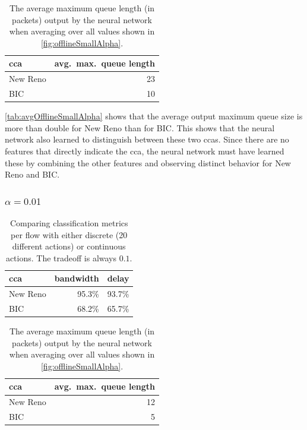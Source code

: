 \documentclass[10pt,sigconf,letterpaper,anonymous]{acmart}
\begin{document}
\begin{table}[h]
\caption{The average maximum queue length (in packets) output by the neural network when averaging over all values shown in \autoref{fig:offlineSmallAlpha}.} \label{tab:avgOfflineSmallAlpha}
\centering
\begin{tabular}{lr} \toprule
\gls{cca} & avg.~max.~queue length \\ \midrule
New Reno & 23 \\
BIC & 10 \\
\bottomrule
\end{tabular}
\end{table}

\autoref{tab:avgOfflineSmallAlpha} shows that the average output maximum queue size is more than double for New Reno than for BIC. This shows that the neural network also learned to distinguish between these two \glspl{cca}. Since there are no features that directly indicate the \gls{cca}, the neural network must have learned these by combining the other features and observing distinct behavior for New Reno and BIC. 

\subsubsection{$\alpha=0.01$}

\begin{table}[h]
\caption{Comparing classification metrics per flow with either discrete (20 different actions) or continuous actions. The tradeoff is always $0.1$.} \label{tab:corrOfflineLargeAlpha}
\centering
\begin{tabular}{lrr} \toprule
\gls{cca} & bandwidth & delay \\ \midrule
New Reno & 95.3\% & 93.7\% \\
BIC & 68.2\% & 65.7\% \\
\bottomrule
\end{tabular}
\end{table}

\begin{table}[h]
\caption{The average maximum queue length (in packets) output by the neural network when averaging over all values shown in \autoref{fig:offlineSmallAlpha}.} \label{tab:avgOfflineLargeAlpha}
\centering
\begin{tabular}{lr} \toprule
\gls{cca} & avg.~max.~queue length \\ \midrule
New Reno & 12 \\
BIC & 5 \\
\bottomrule
\end{tabular}
\end{table}
\end{document}

